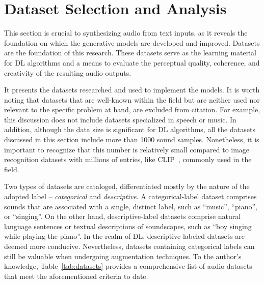 \section{Dataset Selection and Analysis} \label{sec:sol-datasets}

This section is crucial to synthesizing audio from text inputs, as it reveals the foundation on which the generative models are developed and improved. Datasets are the foundation of this research. These datasets serve as the learning material for \ac{DL} algorithms and a means to evaluate the perceptual quality, coherence, and creativity of the resulting audio outputs.

It presents the datasets researched and used to implement the models. It is worth noting that datasets that are well-known within the field but are neither used nor relevant to the specific problem at hand, are excluded from citation. For example, this discussion does not include datasets specialized in speech or music. In addition, although the data size is significant for \ac{DL} algorithms, all the datasets discussed in this section include more than 1000 sound samples. Nonetheless, it is important to recognize that this number is relatively small compared to image recognition datasets with millions of entries, like CLIP~\cite{radford_learning_2021}, commonly used in the field.

Two types of datasets are cataloged, differentiated mostly by the nature of the adopted label – \emph{categorical} and \emph{descriptive}. A categorical-label dataset comprises sounds that are associated with a single, distinct label, such as ``music'', ``piano'', or ``singing''. On the other hand, descriptive-label datasets comprise natural language sentences or textual descriptions of soundscapes, such as  ``boy singing while playing the piano''. In the realm of \ac{DL}, descriptive-labeled datasets are deemed more conducive. Nevertheless, datasets containing categorical labels can still be valuable when undergoing augmentation techniques. To the author's knowledge, Table~\ref{tab:datasets} provides a comprehensive list of audio datasets that meet the aforementioned criteria to date.


